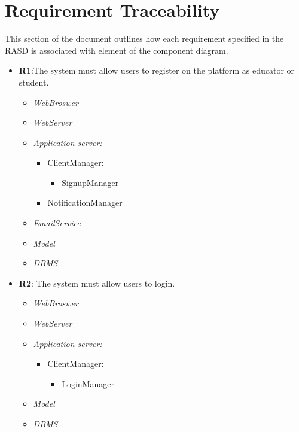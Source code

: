 \section{Requirement Traceability}
This section of the document outlines how each requirement specified in the RASD is associated with element of the component diagram.

\setlength{\parskip}{0em}

    \begin{itemize}
    
        \item \textbf{R1}:The system must allow users to register on the platform as educator or student.
            \begin{itemize}
                \item \textit{WebBroswer}
                \item \textit{WebServer}
                \item \textit{Application server:}\begin{itemize}
                    \item ClientManager:\begin{itemize}
                        \item SignupManager
                    \end{itemize}
                    \item NotificationManager
                \end{itemize}
                \item \textit{EmailService}
                \item \textit{Model}
                \item \textit{DBMS}
            \end{itemize}
        
        \item \textbf{R2}: The system must allow users to login.
            \begin{itemize}
                \item \textit{WebBroswer}
                \item \textit{WebServer}
                \item \textit{Application server:}\begin{itemize}
                    \item ClientManager:\begin{itemize}
                        \item LoginManager
                    \end{itemize}
                \end{itemize}
                \item \textit{Model}
                \item \textit{DBMS}
            \end{itemize}
        

\end{itemize}
